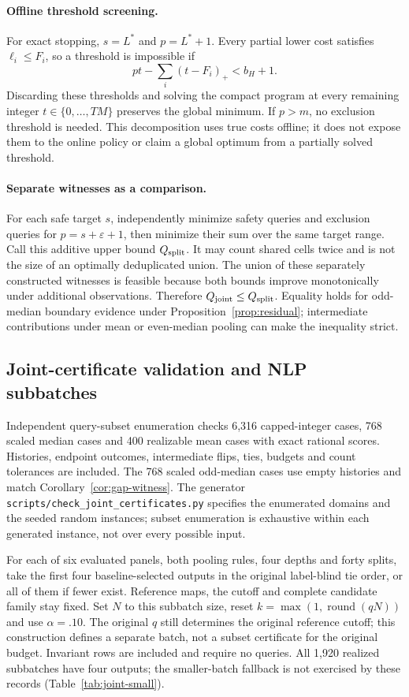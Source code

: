 \paragraph{Offline threshold screening.}
For exact stopping, $s=L^*$ and $p=L^*+1$. Every partial lower cost satisfies $\ell_i\le F_i$, so a threshold is impossible if
\[
 pt-\sum_i(t-F_i)_+<b_H+1.
\]
Discarding these thresholds and solving the compact program at every remaining integer $t\in\{0,\ldots,TM\}$ preserves the global minimum. If $p>m$, no exclusion threshold is needed. This decomposition uses true costs offline; it does not expose them to the online policy or claim a global optimum from a partially solved threshold.

\paragraph{Separate witnesses as a comparison.}
For each safe target $s$, independently minimize safety queries and exclusion queries for $p=s+\varepsilon+1$, then minimize their sum over the same target range. Call this additive upper bound $Q_{\rm split}$. It may count shared cells twice and is not the size of an optimally deduplicated union. The union of these separately constructed witnesses is feasible because both bounds improve monotonically under additional observations. Therefore $Q_{\rm joint}\le Q_{\rm split}$. Equality holds for odd-median boundary evidence under Proposition~\ref{prop:residual}; intermediate contributions under mean or even-median pooling can make the inequality strict.

\subsection{Joint-certificate validation and NLP subbatches}
\label{app:joint-validation}
Independent query-subset enumeration checks 6,316 capped-integer cases, 768 scaled median cases and 400 realizable mean cases with exact rational scores. Histories, endpoint outcomes, intermediate flips, ties, budgets and count tolerances are included. The 768 scaled odd-median cases use empty histories and match Corollary~\ref{cor:gap-witness}. The generator \nolinkurl{scripts/check_joint_certificates.py} specifies the enumerated domains and the seeded random instances; subset enumeration is exhaustive within each generated instance, not over every possible input.

For each of six evaluated panels, both pooling rules, four depths and forty splits, take the first four baseline-selected outputs in the original label-blind tie order, or all of them if fewer exist. Reference maps, the cutoff and complete candidate family stay fixed. Set $N$ to this subbatch size, reset $k=\max(1,\operatorname{round}(qN))$ and use $\alpha=.10$. The original $q$ still determines the original reference cutoff; this construction defines a separate batch, not a subset certificate for the original budget. Invariant rows are included and require no queries. All 1,920 realized subbatches have four outputs; the smaller-batch fallback is not exercised by these records (Table~\ref{tab:joint-small}).

